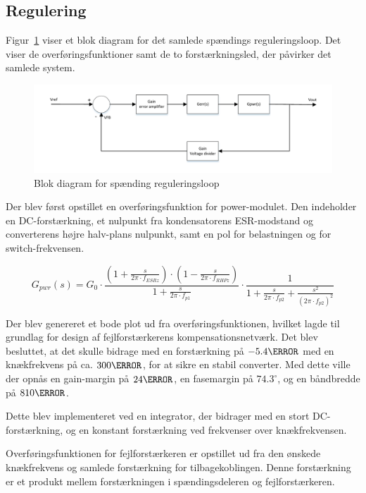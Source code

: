 
\subsection{Regulering}
Figur~\ref{fig:blokdiagram_regulering} viser et blok diagram for det samlede spændings reguleringsloop. Det viser de overføringsfunktioner samt de to forstærkningsled, der påvirker det samlede system.

\begin{figure}[H]
	\centering
	\includegraphics[width=1\linewidth]{../Dokumentation/tex/2iteration/billeder/Regulerings_blokdiagram.pdf}
	\caption{Blok diagram for spænding reguleringsloop}
	\label{fig:blokdiagram_regulering}
\end{figure}

Der blev først opstillet en overføringsfunktion for power-modulet\cite{UCC1801}. Den indeholder en DC-forstærkning, et nulpunkt fra kondensatorens ESR-modstand og converterens højre halv-plans nulpunkt, samt en pol for belastningen og for switch-frekvensen. 

\begin{equation} \label{H_Power}
G_{pwr}(s) = G_0 \cdot \frac{(1+\frac{s}{2\pi \cdot f_{ESRz}}) \cdot (1-\frac{s}{2\pi \cdot f_{RHPz}})}{1+\frac{s}{2\pi \cdot f_{p1}}} \cdot \frac{1}{1 + \frac{s}{2\pi \cdot f_{p2}} + \frac{s^2}{(2\pi \cdot f_{p2})^2}}
\end{equation}

Der blev genereret et bode plot ud fra overføringsfunktionen, hvilket lagde til grundlag for design af fejlforstærkerens kompensationsnetværk. Det blev besluttet, at det skulle bidrage med en forstærkning på $-5.4\decibel$ med en knækfrekvens på ca. $300\hertz$, for at sikre en stabil converter. Med dette ville der opnås en gain-margin på $24\decibel$, en fasemargin på $74.3^\circ$, og en båndbredde på $810\hertz$.

Dette blev implementeret ved en integrator, der bidrager med en stort DC-forstærkning, og en konstant forstærkning ved frekvenser over knækfrekvensen. 

Overføringsfunktionen for fejlforstærkeren er opstillet ud fra den ønskede knækfrekvens og samlede forstærkning for tilbagekoblingen. Denne forstærkning er et produkt mellem forstærkningen i spændingsdeleren og fejlforstærkeren. 

